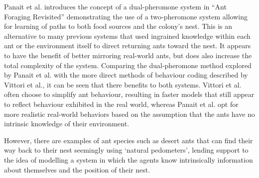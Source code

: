     
    Panait et al. introduces the concept of a dual-pheromone system in ``Ant Foraging Revisited''\cite{a_panait_ant_2004} demonstrating the use of a two-pheromone system allowing for learning of paths to both food sources
    and the colony's nest. This is an alternative to many previous systems that used ingrained knowledge within each ant or the environment itself to direct returning ants toward the nest. It appears to have the benefit %
    of better mirroring real-world ants, but does also increase the total complexity of the system.
    Comparing the dual-pheromone method explored by Panait et al.\cite{a_panait_ant_2004} with the more direct methods of behaviour coding described by Vittori et al.\cite{vittori_modeling_2004}, it can be seen that there
    benefits to both systems. Vittori et al. often choose to simplify ant behaviour, resulting in faster models that still appear to reflect behaviour exhibited in the real world, %
    whereas Panait et al. opt for more realistic real-world behaviors based on the assumption that the ants have no intrinsic knowledge of their environment.
    
    However, there are examples of ant species such as desert ants that can find their way back to their nest seemingly using `natural pedometers'\cite{9}, lending support to the idea of modelling a system in which 
    the agents know intrinsically information about themselves and the position of their nest.


